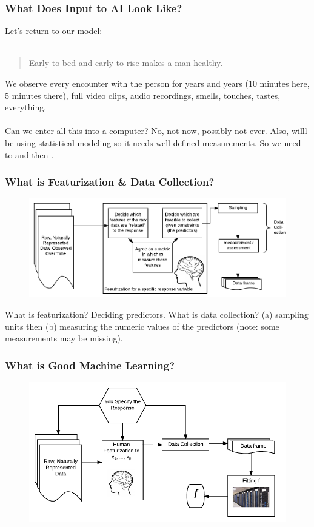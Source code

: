 \documentclass[handout]{beamer}
\begin{document}
\begin{frame}\frametitle{What Does Input to AI Look Like?}

Let's return to our model:\\~\\

\begin{quotation}
Early to bed and early to rise makes a man healthy.
\end{quotation}

We observe every encounter with the person for years and years (10 minutes here, 5 minutes there), full video clips, audio recordings, smells, touches, tastes, everything.\\~\\

Can we enter all this into a computer? No, not now, possibly not ever. Also, willl be using statistical modeling so it needs well-defined measurements. So we need to  and then .

	
\end{frame}

\begin{frame}\frametitle{What is Featurization \& Data Collection?}

\begin{figure}
\centering
\includegraphics[width=4.5in]{featurization}
\end{figure}

What is featurization? Deciding predictors. What is data collection? (a) sampling units then (b) measuring the numeric values of the predictors (note: some measurements may be missing).

\end{frame}

\begin{frame}\frametitle{What is Good Machine Learning?}
\begin{figure}
\centering
\includegraphics[width=4.5in]{good_machine_learning}
\end{figure}

	
\end{frame}
\end{document}
